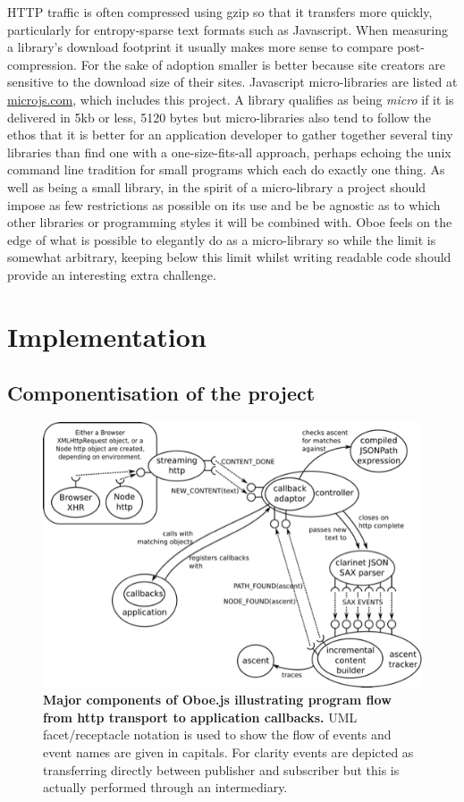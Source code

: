 \documentclass[12pt, ]{article}
\makeatletter
\let\stdsection\section
\renewcommand\section{\newpage\stdsection}
\def\maxwidth{\ifdim\Gin@nat@width>\linewidth\linewidth
\else\Gin@nat@width\fi}
\let\Oldincludegraphics\includegraphics
\renewcommand{\includegraphics}[1]{\Oldincludegraphics[width=\maxwidth]{#1}}
\makeatother
\begin{document}
HTTP traffic is often compressed using gzip so that it transfers more
quickly, particularly for entropy-sparse text formats such as
Javascript. When measuring a library's download footprint it usually
makes more sense to compare post-compression. For the sake of adoption
smaller is better because site creators are sensitive to the download
size of their sites. Javascript micro-libraries are listed at
\href{http://microjs.com}{microjs.com}, which includes this project. A
library qualifies as being \emph{micro} if it is delivered in 5kb or
less, 5120 bytes but micro-libraries also tend to follow the ethos that
it is better for an application developer to gather together several
tiny libraries than find one with a one-size-fits-all approach, perhaps
echoing the unix command line tradition for small programs which each do
exactly one thing. As well as being a small library, in the spirit of a
micro-library a project should impose as few restrictions as possible on
its use and be be agnostic as to which other libraries or programming
styles it will be combined with. Oboe feels on the edge of what is
possible to elegantly do as a micro-library so while the limit is
somewhat arbitrary, keeping below this limit whilst writing readable
code should provide an interesting extra challenge.

\section{Implementation}\label{implementation}

\subsection{Componentisation of the
project}\label{componentisation-of-the-project}

\begin{figure}[htbp]
\centering
\includegraphics{images/overallDesign.png}
\caption{\textbf{Major components of Oboe.js illustrating program flow
from http transport to application callbacks.} UML facet/receptacle
notation is used to show the flow of events and event names are given in
capitals. For clarity events are depicted as transferring directly
between publisher and subscriber but this is actually performed through
an intermediary. \label{overallDesign}}
\end{figure}
\end{document}

